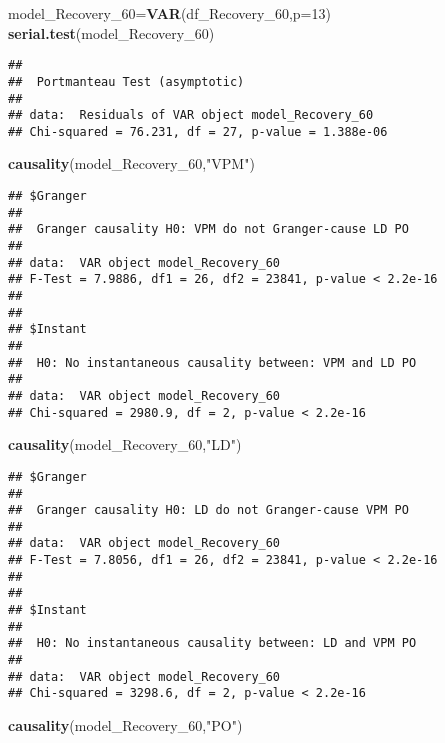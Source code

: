 \documentclass[
]{article}
\newenvironment{Shaded}{\begin{snugshade}}{\end{snugshade}}
\newcommand{\AttributeTok}[1]{\textcolor[rgb]{0.13,0.29,0.53}{#1}}
\newcommand{\DecValTok}[1]{\textcolor[rgb]{0.00,0.00,0.81}{#1}}
\newcommand{\FunctionTok}[1]{\textcolor[rgb]{0.13,0.29,0.53}{\textbf{#1}}}
\newcommand{\NormalTok}[1]{#1}
\newcommand{\OtherTok}[1]{\textcolor[rgb]{0.56,0.35,0.01}{#1}}
\newcommand{\StringTok}[1]{\textcolor[rgb]{0.31,0.60,0.02}{#1}}
\begin{document}
\begin{Shaded}
\begin{Highlighting}[]
\NormalTok{model\_Recovery\_60}\OtherTok{=}\FunctionTok{VAR}\NormalTok{(df\_Recovery\_60,}\AttributeTok{p=}\DecValTok{13}\NormalTok{)}
\FunctionTok{serial.test}\NormalTok{(model\_Recovery\_60)}
\end{Highlighting}
\end{Shaded}

\begin{verbatim}
## 
##  Portmanteau Test (asymptotic)
## 
## data:  Residuals of VAR object model_Recovery_60
## Chi-squared = 76.231, df = 27, p-value = 1.388e-06
\end{verbatim}

\begin{Shaded}
\begin{Highlighting}[]
\FunctionTok{causality}\NormalTok{(model\_Recovery\_60,}\StringTok{"VPM"}\NormalTok{)}
\end{Highlighting}
\end{Shaded}

\begin{verbatim}
## $Granger
## 
##  Granger causality H0: VPM do not Granger-cause LD PO
## 
## data:  VAR object model_Recovery_60
## F-Test = 7.9886, df1 = 26, df2 = 23841, p-value < 2.2e-16
## 
## 
## $Instant
## 
##  H0: No instantaneous causality between: VPM and LD PO
## 
## data:  VAR object model_Recovery_60
## Chi-squared = 2980.9, df = 2, p-value < 2.2e-16
\end{verbatim}

\begin{Shaded}
\begin{Highlighting}[]
\FunctionTok{causality}\NormalTok{(model\_Recovery\_60,}\StringTok{"LD"}\NormalTok{)}
\end{Highlighting}
\end{Shaded}

\begin{verbatim}
## $Granger
## 
##  Granger causality H0: LD do not Granger-cause VPM PO
## 
## data:  VAR object model_Recovery_60
## F-Test = 7.8056, df1 = 26, df2 = 23841, p-value < 2.2e-16
## 
## 
## $Instant
## 
##  H0: No instantaneous causality between: LD and VPM PO
## 
## data:  VAR object model_Recovery_60
## Chi-squared = 3298.6, df = 2, p-value < 2.2e-16
\end{verbatim}

\begin{Shaded}
\begin{Highlighting}[]
\FunctionTok{causality}\NormalTok{(model\_Recovery\_60,}\StringTok{"PO"}\NormalTok{)}
\end{Highlighting}
\end{Shaded}
\end{document}
